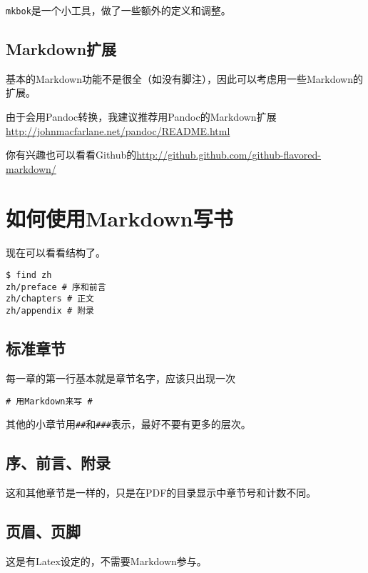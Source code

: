 \documentclass[a4paper]{book}
\begin{document}
{\texttt{mkbok}}是一个小工具，做了一些额外的定义和调整。

\subsection{Markdown扩展}

基本的Markdown功能不是很全（如没有脚注），因此可以考虑用一些Markdown的扩展。

由于会用Pandoc转换，我建议推荐用Pandoc的Markdown扩展\url{http://johnmacfarlane.net/pandoc/README.html}

你有兴趣也可以看看Github的\url{http://github.github.com/github-flavored-markdown/}

\section{如何使用Markdown写书}

现在可以看看结构了。

{\footnotesize\begin{shaded}\begin{verbatim}
$ find zh
zh/preface # 序和前言
zh/chapters # 正文
zh/appendix # 附录
\end{verbatim}\end{shaded}}
\subsection{标准章节}

每一章的第一行基本就是章节名字，应该只出现一次

{\footnotesize\begin{shaded}\begin{verbatim}
# 用Markdown来写 #
\end{verbatim}\end{shaded}}
其他的小章节用{\texttt{\#{}\#{}}}和{\texttt{\#{}\#{}\#{}}}表示，最好不要有更多的层次。

\subsection{序、前言、附录}

这和其他章节是一样的，只是在PDF的目录显示中章节号和计数不同。

\subsection{页眉、页脚}

这是有Latex设定的，不需要Markdown参与。
\end{document}
